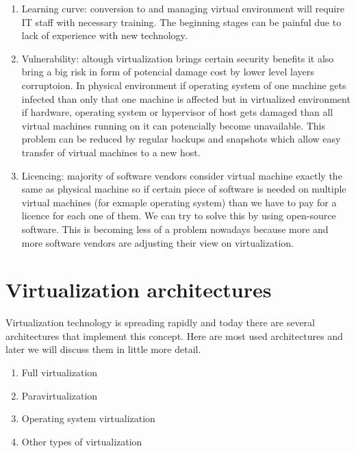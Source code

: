 \begin{itemize}
\begin{enumerate}
\item Learning curve: conversion to and managing virtual environment will require IT staff with necessary training. The beginning stages can be painful due to lack of experience with new technology.

\item Vulnerability: altough virtualization brings certain security benefits it also bring a big risk in form of potencial damage cost by lower level layers corruptoion. In physical environment if operating system of one machine gets infected than only that one machine is affected but in virtualized environment if hardware, operating system or hypervisor of host gets damaged than all virtual machines running on it can potencially become unavailable. This problem can be reduced by regular backups and snapshots which allow easy transfer of virtual machines to a new host.

\item Licencing: majority of software vendors consider virtual machine exactly the same as physical machine so if certain piece of software is needed on multiple virtual machines (for exmaple operating system) than we have to pay for a licence for each one of them. We can try to solve this by using open-source software. This is becoming less of a problem nowadays because more and more software vendors are adjusting their view on virtualization.
\end{enumerate}


\section{Virtualization architectures}
Virtualization technology is spreading rapidly and today there are several architectures that implement this concept. Here are most used architectures and later we will discuss them in little more detail.
\begin{enumerate}
\item Full virtualization
\item Paravirtualization
\item Operating system virtualization
\item Other types of virtualization
\end{enumerate}


\end{itemize}
